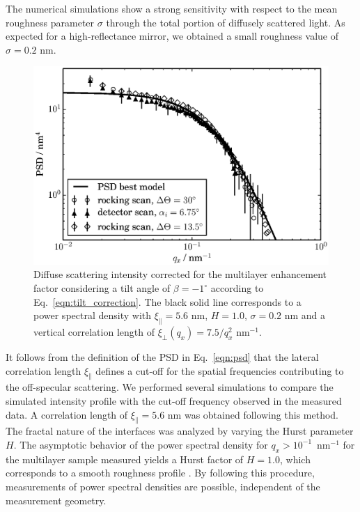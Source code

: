 The numerical simulations show a strong sensitivity with respect to the mean roughness parameter $\sigma$ through the total portion of diffusely scattered light. As expected for a high-reflectance mirror, we obtained a small roughness value of $\sigma = 0.2$ nm.
\begin{figure}
        \includegraphics[width=0.5
        \textwidth]{img/im_mo_si/PSD_zoomed} \caption{Diffuse scattering intensity corrected for the multilayer enhancement factor considering a tilt angle of $\beta=-1^{\circ}$ according to Eq.~\eqref{eqn:tilt_correction}. The black solid line corresponds to a power spectral density with $\xi_\parallel=5.6$ nm, $H=1.0$, $\sigma=0.2$ nm and a vertical correlation length of $\xi_\perp(q_x)=7.5/q_x^2$ nm$^{-1}$.} \label{fig:PSDs_linear} 
\end{figure}

It follows from the definition of the PSD in Eq.~\eqref{eqn:psd} that the lateral correlation length $\xi_\parallel$ defines a cut-off for the spatial frequencies contributing to the off-specular scattering. We performed several simulations to compare the simulated intensity profile with the cut-off frequency observed in the measured data. A correlation length of $\xi_\parallel=5.6$ nm was obtained following this method. The fractal nature of the interfaces was analyzed by varying the Hurst parameter $H$. The asymptotic behavior of the power spectral density for $q_x>10^{-1}$~nm$^{-1}$ for the multilayer sample measured yields a Hurst factor of $H=1.0$, which corresponds to a smooth roughness profile \cite{PhysRevB.38.2297}. By following this procedure, measurements of power spectral densities are possible, independent of the measurement geometry.

